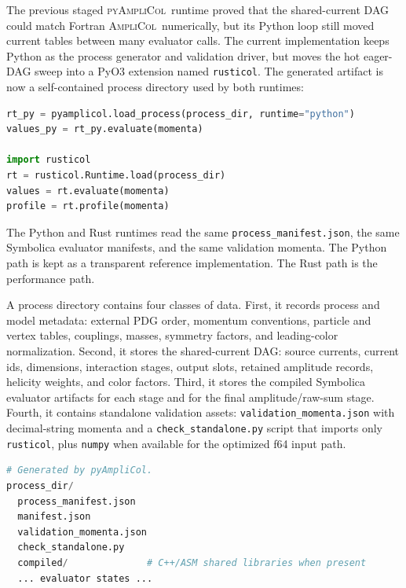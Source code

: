 \documentclass[10pt]{article}
\newcommand{\AC}{\textsc{AmpliCol}}
\newcommand{\PAC}{\textsc{pyAmpliCol}}
\begin{document}
The previous staged \PAC\ runtime proved that the shared-current DAG could
match Fortran \AC\ numerically, but its Python loop still moved current tables
between many evaluator calls.  The current implementation keeps Python as the
process generator and validation driver, but moves the hot eager-DAG sweep into
a PyO3 extension named \texttt{rusticol}.  The generated artifact is now a
self-contained process directory used by both runtimes:
\begin{lstlisting}[language=Python]
rt_py = pyamplicol.load_process(process_dir, runtime="python")
values_py = rt_py.evaluate(momenta)

import rusticol
rt = rusticol.Runtime.load(process_dir)
values = rt.evaluate(momenta)
profile = rt.profile(momenta)
\end{lstlisting}
The Python and Rust runtimes read the same \texttt{process\_manifest.json}, the
same Symbolica evaluator manifests, and the same validation momenta.  The
Python path is kept as a transparent reference implementation.  The Rust path is
the performance path.

A process directory contains four classes of data.  First, it records process
and model metadata: external PDG order, momentum conventions, particle and
vertex tables, couplings, masses, symmetry factors, and leading-color
normalization.  Second, it stores the shared-current DAG: source currents,
current ids, dimensions, interaction stages, output slots, retained amplitude
records, helicity weights, and color factors.  Third, it stores the compiled
Symbolica evaluator artifacts for each stage and for the final amplitude/raw-sum
stage.  Fourth, it contains standalone validation assets:
\texttt{validation\_momenta.json} with decimal-string momenta and a
\texttt{check\_standalone.py} script that imports only \texttt{rusticol}, plus
\texttt{numpy} when available for the optimized f64 input path.

\begin{lstlisting}[language=Python]
# Generated by pyAmpliCol.
process_dir/
  process_manifest.json
  manifest.json
  validation_momenta.json
  check_standalone.py
  compiled/              # C++/ASM shared libraries when present
  ... evaluator states ...
\end{lstlisting}
\end{document}
